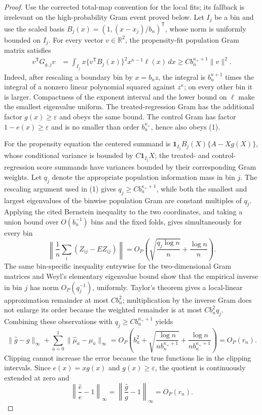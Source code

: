 \documentclass{article}
\begin{document}
\begin{proof}
Use the corrected total-map convention for the local fits; its fallback is irrelevant on the high-probability Gram event proved below.  Let \(I_j\) be a bin and use the scaled basis \(B_j(x)=(1,(x-x_j)/b_n)^{\mathsf T}\), whose norm is uniformly bounded on \(I_j\).  For every vector \(v\in\mathbb R^2\), the propensity-fit population Gram matrix satisfies
\[
\begin{split}
 v^{\mathsf T}G_{g,j}v
 &=\int_{I_j}x\{v^{\mathsf T}B_j(x)\}^2x^{\kappa-1}\ell(x)\,dx
 \geq C b_n^{\kappa_++1}\|v\|^2.
\end{split} \tag{1}
\]
Indeed, after rescaling a boundary bin by \(x=b_nz\), the integral is \(b_n^{\kappa+1}\) times the integral of a nonzero linear polynomial squared against \(z^\kappa\); on every other bin it is larger.  Compactness of the exponent interval and the lower bound on \(\ell\) make the smallest eigenvalue uniform.  The treated-regression Gram has the additional factor \(g(x)\geq\varepsilon\) and obeys the same bound.  The control Gram has factor \(1-e(x)\geq\varepsilon\) and is no smaller than order \(b_n^{\kappa_+}\), hence also obeys (1).

For the propensity equation the centered summand is \(\mathbf1_{I_j}B_j(X)\{A-Xg(X)\}\), whose conditional variance is bounded by \(C\mathbf1_{I_j}X\); the treated- and control-regression score summands have variances bounded by their corresponding Gram weights.  Let \(q_j\) denote the appropriate population information mass in bin \(j\).  The rescaling argument used in (1) gives \(q_j\geq Cb_n^{\kappa_++1}\), while both the smallest and largest eigenvalues of the binwise population Gram are constant multiples of \(q_j\).  Applying the cited Bernstein inequality to the two coordinates, and taking a union bound over \(O(b_n^{-1})\) bins and the fixed folds, gives simultaneously for every bin
\[
 \left\|\frac1n\sum_i(Z_{ij}-EZ_{ij})\right\|
 =O_P\!\left(\sqrt{\frac{q_j\log n}{n}}+\frac{\log n}{n}\right). \tag{2}
\]
The same bin-specific inequality entrywise for the two-dimensional Gram matrices and Weyl's elementary eigenvalue bound show that the empirical inverse in bin \(j\) has norm \(O_P(q_j^{-1})\), uniformly.  Taylor's theorem gives a local-linear approximation remainder at most \(C b_n^2\); multiplication by the inverse Gram does not enlarge its order because the weighted remainder is at most \(Cb_n^2q_j\).  Combining these observations with \(q_j\geq Cb_n^{\kappa_++1}\) yields
\[
 \|\widehat g-g\|_\infty+\sum_{a=0}^1\|\widehat\mu_a-\mu_a\|_\infty
 =O_P\!\left(b_n^2+\sqrt{\frac{\log n}{n b_n^{\kappa_++1}}}
 +\frac{\log n}{n b_n^{\kappa_++1}}\right)=O_P(r_n). \tag{3}
\]
Clipping cannot increase the error because the true functions lie in the clipping intervals.  Since \(e(x)=xg(x)\) and \(g(x)\geq\varepsilon\), the quotient is continuously extended at zero and
\[
 \left\|\frac{\widehat e}{e}-1\right\|_\infty
 =\left\|\frac{\widehat g}{g}-1\right\|_\infty=O_P(r_n). \tag{4}
\]


\end{proof}
\end{document}
